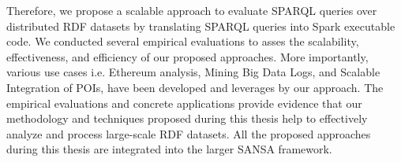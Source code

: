 Therefore, we propose a scalable approach to evaluate SPARQL queries over distributed RDF datasets by translating SPARQL queries into Spark executable code.
We conducted several empirical evaluations to asses the scalability, effectiveness, and efficiency of our proposed approaches.
More importantly, various use cases i.e. Ethereum analysis, Mining Big Data Logs, and Scalable Integration of POIs, have been developed and leverages by our approach. 
The empirical evaluations and concrete applications provide evidence that our methodology and techniques proposed during this thesis help to effectively analyze and process large-scale RDF datasets.
All the proposed approaches during this thesis are integrated into the larger SANSA framework.

